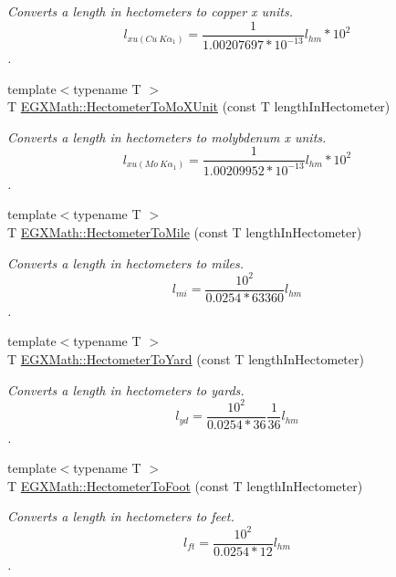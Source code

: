 \begin{DoxyCompactItemize}
\begin{DoxyCompactList}\small\item\em Converts a length in hectometers to copper x units. \[ l_{xu(Cu\ K\alpha_1)}= \frac{1}{1.00207697*10^{-13}} l_{hm} * 10^{2}\]. \end{DoxyCompactList}\item 
{\footnotesize template$<$typename T $>$ }\\T \mbox{\hyperlink{group___e_g_x_math-_conversions-_length_conversions-_s_i-_hectometer-_non-_s_i_gac2840604040746ae9a4c51fd1bb3e6f6}{E\+G\+X\+Math\+::\+Hectometer\+To\+Mo\+X\+Unit}} (const T length\+In\+Hectometer)
\begin{DoxyCompactList}\small\item\em Converts a length in hectometers to molybdenum x units. \[ l_{xu(Mo\ K\alpha_1)}=\frac{1}{1.00209952*10^{-13}} l_{hm} * 10^{2}\]. \end{DoxyCompactList}\item 
{\footnotesize template$<$typename T $>$ }\\T \mbox{\hyperlink{group___e_g_x_math-_conversions-_length_conversions-_s_i-_hectometer-_imperial_gabb3930dfb3335dc53303ec8ce9145d71}{E\+G\+X\+Math\+::\+Hectometer\+To\+Mile}} (const T length\+In\+Hectometer)
\begin{DoxyCompactList}\small\item\em Converts a length in hectometers to miles. \[ l_{mi}=\frac{10^{2}}{0.0254 * 63360} l_{hm} \]. \end{DoxyCompactList}\item 
{\footnotesize template$<$typename T $>$ }\\T \mbox{\hyperlink{group___e_g_x_math-_conversions-_length_conversions-_s_i-_hectometer-_imperial_ga84866f087daa74cdd00348f42462d13c}{E\+G\+X\+Math\+::\+Hectometer\+To\+Yard}} (const T length\+In\+Hectometer)
\begin{DoxyCompactList}\small\item\em Converts a length in hectometers to yards. \[ l_{yd}= \frac{10^{2}}{0.0254 * 36} \frac{1}{36} l_{hm} \]. \end{DoxyCompactList}\item 
{\footnotesize template$<$typename T $>$ }\\T \mbox{\hyperlink{group___e_g_x_math-_conversions-_length_conversions-_s_i-_hectometer-_imperial_ga8b57e6e5bef662cc96b8b7dde68659a6}{E\+G\+X\+Math\+::\+Hectometer\+To\+Foot}} (const T length\+In\+Hectometer)
\begin{DoxyCompactList}\small\item\em Converts a length in hectometers to feet. \[ l_{ft}= \frac{10^{2}}{0.0254 * 12} l_{hm} \]. \end{DoxyCompactList}\item 

\end{DoxyCompactItemize}
